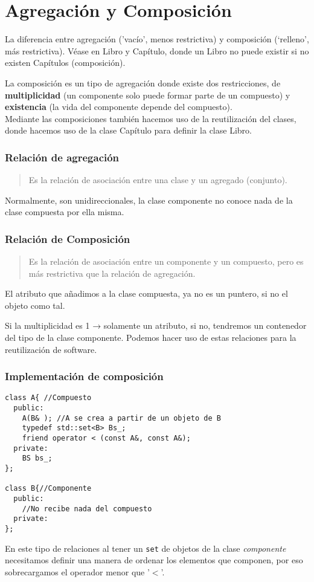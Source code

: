 \chapter{Agregación y Composición}
La diferencia entre agregación (’vacío’, menos restrictiva) y composición (‘relleno’, más restrictiva).
Véase en Libro y Capítulo, donde un Libro no puede existir si no existen Capítulos (composición).

La composición es un tipo de agregación donde existe dos restricciones, de \textbf{multiplicidad} (un componente solo puede formar parte de un compuesto) y \textbf{existencia} (la vida del componente depende del compuesto).\\
Mediante las composiciones también hacemos uso de la reutilización del clases, donde hacemos uso de la clase Capítulo para definir la clase Libro.
\vspace{-0.5cm}
\subsection{Relación de agregación}
\begin{quote}
	Es la relación de asociación entre una clase y un agregado (conjunto).
\end{quote}
Normalmente, son unidireccionales, la clase componente no conoce nada de la clase compuesta por ella misma.
\vspace{-0.5cm}
\subsection{Relación de Composición}
\begin{quote}
	Es la relación de asociación entre un componente y un compuesto, pero es más restrictiva que la relación de agregación.
\end{quote}
El atributo que añadimos a la clase compuesta, ya no es un puntero, si no el objeto como tal.

Si la multiplicidad es 1 → solamente un atributo, si no, tendremos un contenedor del tipo de la clase componente.
Podemos hacer uso de estas relaciones para la reutilización de software.
\subsection{ Implementación de composición}
\begin{center}
	\begin{lstlisting}[frame=single]
class A{ //Compuesto
  public:
  	A(B& ); //A se crea a partir de un objeto de B
    typedef std::set<B> Bs_;
    friend operator < (const A&, const A&);
  private:
    BS bs_;
};

class B{//Componente
  public:
    //No recibe nada del compuesto
  private:
};
\end{lstlisting}
\end{center}
En este tipo de relaciones al tener un \texttt{set} de objetos de la clase \textit{componente} necesitamos definir una manera de ordenar los elementos que componen, por eso sobrecargamos el operador menor que '$<$'.